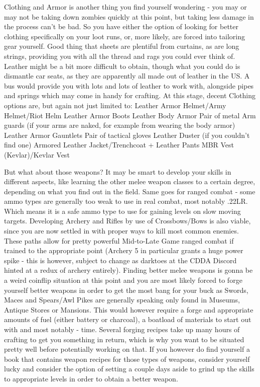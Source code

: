 \documentclass[11pt]{report}
\begin{document}
Clothing and Armor is another thing you find yourself wondering - you may or may not be taking down zombies quickly at this point, but taking less damage in the process can't be bad. So you have either the option of looking for better clothing specifically on your loot runs, or, more likely, are forced into tailoring gear yourself. Good thing that sheets are plentiful from curtains, as are long strings, providing you with all the thread and rags you could ever think of. Leather might be a bit more difficult to obtain, though what you could do is dismantle car seats, as they are apparently all made out of leather in the US. A bus would provide you with lots and lots of leather to work with, alongside pipes and springs which may come in handy for crafting. At this stage, decent Clothing options are, but again not just limited to:
Leather Armor Helmet/Army Helmet/Riot Helm
Leather Armor Boots
Leather Body Armor
Pair of metal Arm guards (if your arms are naked, for example from wearing the body armor)
Leather Armor Gauntlets
Pair of tactical gloves
Leather Duster (if you couldn't find one)
Armored Leather Jacket/Trenchcoat + Leather Pants
MBR Vest (Kevlar)/Kevlar Vest

But what about those weapons? It may be smart to develop your skills in different aspects, like learning the other melee weapon classes to a certain degree, depending on what you find out in the field. Same goes for ranged combat - some ammo types are generally too weak to use in real combat, most notably .22LR. Which means it is a safe ammo type to use for gaining levels on slow moving targets. Developing Archery and Rifles by use of Crossbows/Bows is also viable, since you are now settled in with proper ways to kill most common enemies. These paths allow for pretty powerful Mid-to-Late Game ranged combat if trained to the appropriate point (Archery 5 in particular grants a huge power spike - this is however, subject to change as darktoes at the CDDA Discord hinted at a redux of archery entirely).
Finding better melee weapons is gonna be a weird coinflip situation at this point and you are most likely forced to forge yourself better weapons in order to get the most bang for your buck as Swords, Maces and Spears/Awl Pikes are generally speaking only found in Museums, Antique Stores or Mansions. This would however require a forge and appropriate amounts of fuel (either battery or charcoal), a boatload of materials to start out with and most notably - time. Several forging recipes take up many hours of crafting to get you something in return, which is why you want to be situated pretty well before potentially working on that. If you however do find yourself a book that contains weapon recipes for those types of weapons, consider yourself lucky and consider the option of setting a couple days aside to grind up the skills to appropriate levels in order to obtain a better weapon.
\end{document}
